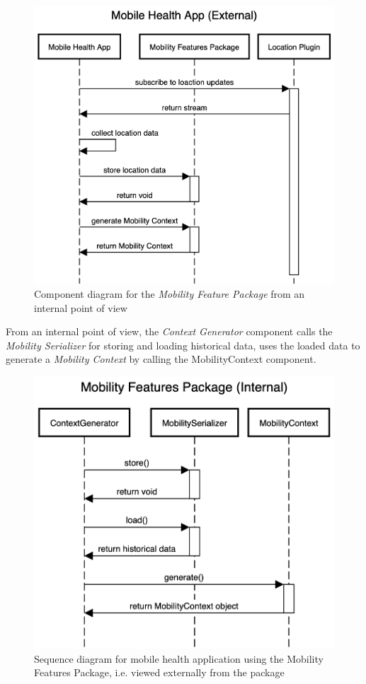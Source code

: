 \begin{figure}[h]
\centering
\includegraphics[width=\textwidth]{images/diagrams/sequence-external.png}
\caption{Component diagram for the \textit{Mobility Feature Package} from an internal point of view}
\label{fig:sequence-diagram-external}
\end{figure}

From an internal point of view, the \textit{Context Generator} component calls the \textit{Mobility Serializer} for storing and loading historical data, uses the loaded data to generate a \textit{Mobility Context} by calling the MobilityContext component.
\begin{figure}[h]
\centering
\includegraphics[width=\textwidth]{images/diagrams/sequence-internal.png}
\caption{Sequence diagram for mobile health application using the Mobility Features Package, i.e. viewed externally from the package}
\label{fig:sequence-diagram-external}
\end{figure}